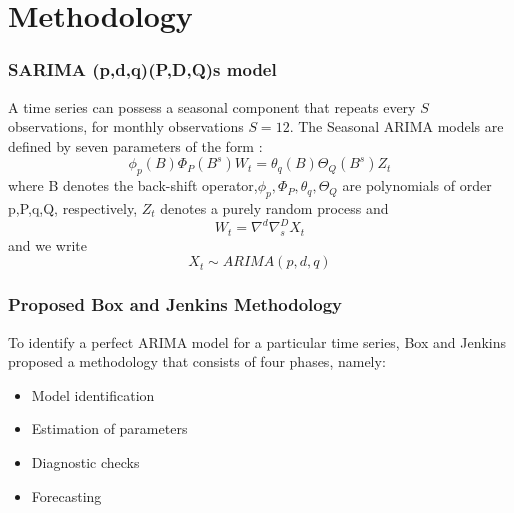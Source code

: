 \documentclass[]{beamer}
\begin{document}
\section{Methodology}
\begin{frame}
\frametitle{SARIMA (p,d,q)(P,D,Q)s model}
A time series can possess a seasonal component that repeats every $ S $ observations, for monthly observations $S = 12$. The Seasonal ARIMA models are defined by seven parameters of the form :
\begin{equation}
	\phi_{p}(B)\Phi_{P}(B^{s})W_{t}=\theta_{q}(B)\Theta_{Q}(B^{s})Z_{t}
\end{equation}
where B denotes the back-shift operator,$\phi_{p},\Phi_{P},\theta_{q},\Theta_{Q} $ are polynomials of order p,P,q,Q, respectively, $ Z_{t} $ denotes a purely random process and
\begin{equation}
	W_{t}=\nabla^{d}\nabla_{s}^{D}X_{t}
\end{equation} and we write
\begin{equation}
	X_{t}\sim ARIMA(p,d,q)
\end{equation}
\end{frame}
\begin{frame}
\frametitle{Proposed Box and Jenkins Methodology}
To identify a perfect ARIMA model for a particular time series, Box and Jenkins proposed a methodology that consists of four phases, namely:
\begin{itemize}
\item Model identification
\item Estimation of parameters
\item Diagnostic checks
\item Forecasting
\end{itemize}
\end{frame}
\end{document}
